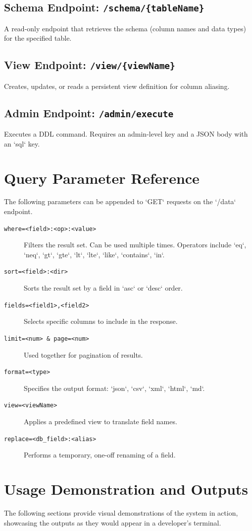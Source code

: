 \documentclass[12pt, a4paper]{report}
\begin{document}
\subsection{Schema Endpoint: \texttt{/schema/\{tableName\}}}
A read-only endpoint that retrieves the schema (column names and data types) for the specified table.

\subsection{View Endpoint: \texttt{/view/\{viewName\}}}
Creates, updates, or reads a persistent view definition for column aliasing.

\subsection{Admin Endpoint: \texttt{/admin/execute}}
Executes a DDL command. Requires an admin-level key and a JSON body with an `sql` key.

\section{Query Parameter Reference}
The following parameters can be appended to `GET` requests on the `/data` endpoint.

\begin{description}
    \item[\texttt{where=<field>:<op>:<value>}] Filters the result set. Can be used multiple times. Operators include `eq`, `neq`, `gt`, `gte`, `lt`, `lte`, `like`, `contains`, `in`.
    \item[\texttt{sort=<field>:<dir>}] Sorts the result set by a field in `asc` or `desc` order.
    \item[\texttt{fields=<field1>,<field2>}] Selects specific columns to include in the response.
    \item[\texttt{limit=<num> \& page=<num>}] Used together for pagination of results.
    \item[\texttt{format=<type>}] Specifies the output format: `json`, `csv`, `xml`, `html`, `md`.
    \item[\texttt{view=<viewName>}] Applies a predefined view to translate field names.
    \item[\texttt{replace=<db_field>:<alias>}] Performs a temporary, one-off renaming of a field.
\end{description}

\section{Usage Demonstration and Outputs}
The following sections provide visual demonstrations of the system in action, showcasing the outputs as they would appear in a developer's terminal.
\end{document}
